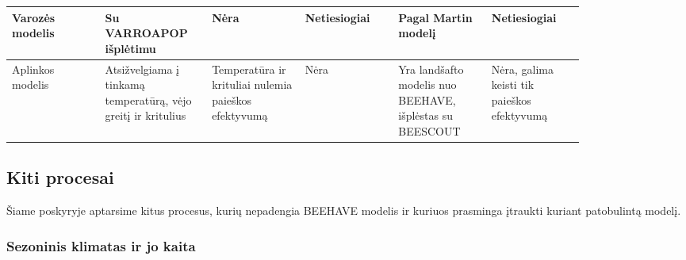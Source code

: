 \documentclass{VUMIFKompMagistrinis}
\begin{document}
\begin{table} [H]
\begin{tabular}{p{0.14\linewidth}|p{0.14\linewidth}|p{0.14\linewidth}|p{0.14\linewidth}|p{0.14\linewidth}|p{0.14\linewidth}}
\hline
Varozės modelis & Su VARROAPOP išplėtimu \cite{HoC05} & Nėra & Netiesiogiai & Pagal Martin modelį \cite{MAR01} & Netiesiogiai \\
\hline
Aplinkos modelis & Atsižvelgia\-ma į tinkamą temperatūrą, vėjo greitį ir kritulius & Temperatūra ir krituliai nulemia pa\-ieškos e\-fek\-ty\-vu\-mą & Nėra & Yra landšafto modelis nuo BEEHAVE, išplėstas su BEESCOUT & Nėra, galima keisti tik paieškos efektyvumą
\end{tabular}
\label{tab:models}
\end{table}


\subsection{Kiti procesai}

Šiame poskyryje aptarsime kitus procesus, kurių nepadengia BEEHAVE modelis ir kuriuos prasminga įtraukti kuriant patobulintą modelį.

\subsubsection{Sezoninis klimatas ir jo kaita}
\end{document}
